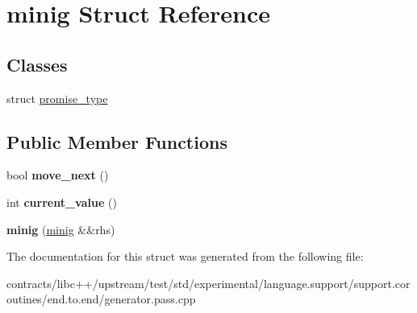 \hypertarget{structminig}{}\section{minig Struct Reference}
\label{structminig}
\subsection*{Classes}
\begin{DoxyCompactItemize}
\item 
struct \mbox{\hyperlink{structminig_1_1promise__type}{promise\+\_\+type}}
\end{DoxyCompactItemize}
\subsection*{Public Member Functions}
\begin{DoxyCompactItemize}
\item 
\mbox{\label{structminig_a93faa33500e09f4ce1db5ed584ca1340}} 
bool {\bfseries move\+\_\+next} ()
\item 
\mbox{\label{structminig_af8f94311091ae119b1e2b4855ef33bf7}} 
int {\bfseries current\+\_\+value} ()
\item 
\mbox{\label{structminig_a0000442e7b990cae913b26493244b37e}} 
{\bfseries minig} (\mbox{\hyperlink{structminig}{minig}} \&\&rhs)
\end{DoxyCompactItemize}


The documentation for this struct was generated from the following file\+:\begin{DoxyCompactItemize}
\item 
contracts/libc++/upstream/test/std/experimental/language.\+support/support.\+coroutines/end.\+to.\+end/generator.\+pass.\+cpp\end{DoxyCompactItemize}

